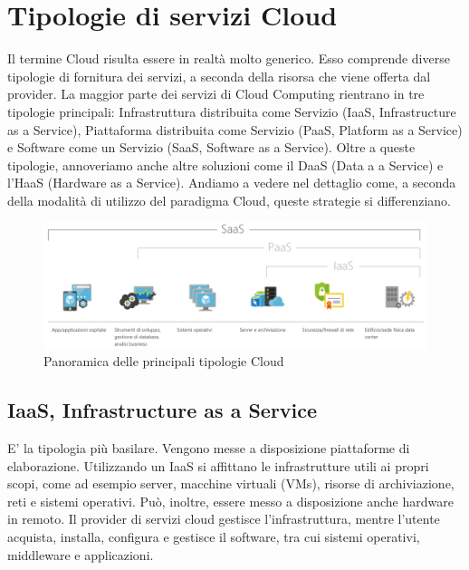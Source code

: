 \section{Tipologie di servizi Cloud}
Il termine Cloud risulta essere in realtà molto generico. Esso comprende diverse tipologie di fornitura dei servizi, a seconda della risorsa che viene offerta dal provider. La maggior parte dei servizi di Cloud Computing rientrano in tre tipologie principali: Infrastruttura distribuita come Servizio (IaaS, Infrastructure as a Service), Piattaforma distribuita come Servizio (PaaS, Platform as a Service) e Software come un Servizio (SaaS, Software as a Service). Oltre a queste tipologie, annoveriamo anche altre soluzioni come il DaaS (Data a a Service) e l'HaaS (Hardware as a Service). Andiamo a vedere nel dettaglio come, a seconda della modalità di utilizzo del paradigma Cloud, queste strategie si differenziano. 
\begin{figure}
	\centering
	\includegraphics[width=0.7\linewidth]{capitoli/imgs/TipologieCloud}
	\caption{Panoramica delle principali tipologie Cloud}
	\label{fig:tipologiecloud}
\end{figure}

\subsection{IaaS, Infrastructure as a Service}
E' la tipologia più basilare. Vengono messe a disposizione piattaforme di elaborazione. Utilizzando un IaaS si affittano le infrastrutture utili ai propri scopi, come ad esempio server, macchine virtuali (VMs), risorse di archiviazione, reti e sistemi operativi. Può, inoltre, essere messo a disposizione anche hardware in remoto. Il provider di servizi cloud gestisce l'infrastruttura, mentre l'utente acquista, installa, configura e gestisce il software, tra cui sistemi operativi, middleware e applicazioni.
